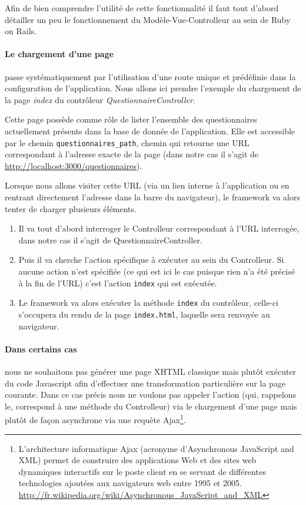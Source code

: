 \documentclass[12pt,a4paper]{book}
\begin{document}
Afin de bien comprendre l'utilité de cette fonctionnalité il faut tout d'abord détailler un peu le fonctionnement du Modèle-Vue-Controlleur au sein de Ruby on Rails.

\paragraph{Le chargement d'une page} passe systématiquement par l'utilisation d'une route unique et prédéfinie dans la configuration de l'application. Nous allons ici prendre l'exemple du chargement de la page \textit{index} du contrôleur \textit{QuestionnaireController}.

Cette page possède comme rôle de lister l'ensemble des questionnaires actuellement présents dans la base de donnée de l'application. Elle est accessible par le chemin \texttt{questionnaires\_path}, chemin qui retourne une URL correspondant à l'adresse exacte de la page (dans notre cas il s'agit de \url{http://localhost:3000/questionnaires}).

Lorsque nous allons visiter cette URL (via un lien interne à l'application ou en rentrant directement l'adresse dans la barre du navigateur), le framework va alors tenter de charger plusieurs éléments.

\begin{enumerate}
  \item Il va tout d'abord interroger le Controlleur correspondant à l'URL interrogée, dans notre cas il s'agit de QuestionnaireController.
  \item Puis il va cherche l'action spécifique à exécuter au sein du Controlleur. Si aucune action n'est spécifiée (ce qui est ici le cas puisque rien n'a été précisé à la fin de l'URL) c'est l'action \texttt{index} qui est exécutée.
  \item Le framework va alors exécuter la méthode \texttt{index} du contrôleur, celle-ci s'occupera du rendu de la page \texttt{index.html}, laquelle sera renvoyée au navigateur.
\end{enumerate}

\paragraph{Dans certains cas} nous ne souhaitons pas générer une page XHTML classique mais plutôt exécuter du code Javascript afin d'effectuer une transformation particulière sur la page courante. Dans ce cas précis nous ne voulons pas appeler l'action (qui, rappelons le, correspond à une méthode du Controlleur) via le chargement d'une page mais plutôt de façon asynchrone via une requète Ajax\footnote{L'architecture informatique Ajax (acronyme d'Asynchronous JavaScript and XML) permet de construire des applications Web et des sites web dynamiques interactifs sur le poste client en se servant de différentes technologies ajoutées aux navigateurs web entre 1995 et 2005. \url{http://fr.wikipedia.org/wiki/Asynchronous_JavaScript_and_XML}}. 
\end{document}
